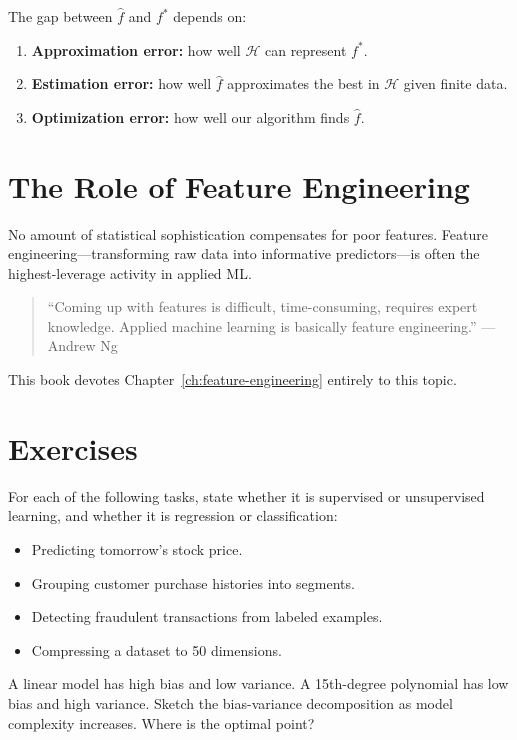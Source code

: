 The gap between $\hat{f}$ and $f^*$ depends on:
\begin{enumerate}
	\item \textbf{Approximation error:} how well $\mathcal{H}$ can represent $f^*$.
	\item \textbf{Estimation error:} how well $\hat{f}$ approximates the best in $\mathcal{H}$ given finite data.
	\item \textbf{Optimization error:} how well our algorithm finds $\hat{f}$.
\end{enumerate}

\section{The Role of Feature Engineering}

No amount of statistical sophistication compensates for poor features. Feature engineering---transforming raw data into informative predictors---is often the highest-leverage activity in applied ML.

\begin{quote}
	``Coming up with features is difficult, time-consuming, requires expert knowledge. Applied machine learning is basically feature engineering.'' --- Andrew Ng
\end{quote}

This book devotes Chapter~\ref{ch:feature-engineering} entirely to this topic.

\section{Exercises}

\begin{exercise}
	For each of the following tasks, state whether it is supervised or unsupervised learning, and whether it is regression or classification:
	\begin{itemize}
		\item Predicting tomorrow's stock price.
		\item Grouping customer purchase histories into segments.
		\item Detecting fraudulent transactions from labeled examples.
		\item Compressing a dataset to 50 dimensions.
	\end{itemize}
\end{exercise}

\begin{exercise}
	A linear model has high bias and low variance. A 15th-degree polynomial has low bias and high variance. Sketch the bias-variance decomposition as model complexity increases. Where is the optimal point?
\end{exercise}

